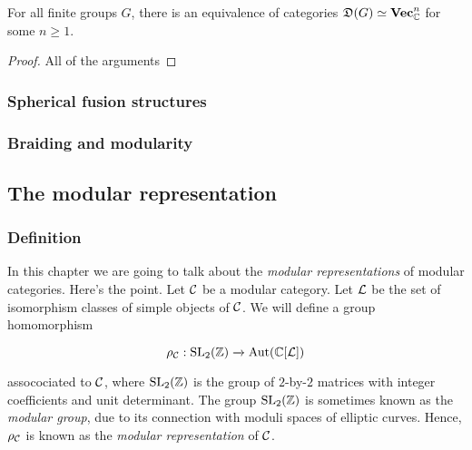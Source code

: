 \begin{prop} For all finite groups $G$, there is an equivalence of categories ${\mathfrak D}(G)\simeq {\bf Vec}_{{\mathbb C}}^n$ for some $n\geq 1$.
\end{prop}
\begin{proof} All of the arguments 
\end{proof}

\subsubsection{Spherical fusion structures}


\subsubsection{Braiding and modularity}



\subsection{The modular representation}

\subsubsection{Definition}

In this chapter we are going to talk about the {\em modular representations} of modular categories. Here's the point. Let ${\mathcal C}$ be a modular category. Let ${\mathcal L}$ be the set of isomorphism classes of simple objects of ${\mathcal C}$. We will define a group homomorphism

$$\rho_{{\mathcal C}}:\operatorname{SL}_2({\mathbb Z})\xrightarrow{}\operatorname{Aut}({\mathbb C}[{\mathcal L}])$$

assocociated to ${\mathcal C}$, where $\operatorname{SL}_2({\mathbb Z})$ is the group of $2$-by-$2$ matrices with integer coefficients and unit determinant. The group $\operatorname{SL}_2({\mathbb Z})$ is sometimes known as the {\em modular group}, due to its connection with moduli spaces of elliptic curves. Hence, $\rho_{{\mathcal C}}$ is known as the {\em modular representation} of ${\mathcal C}$.

